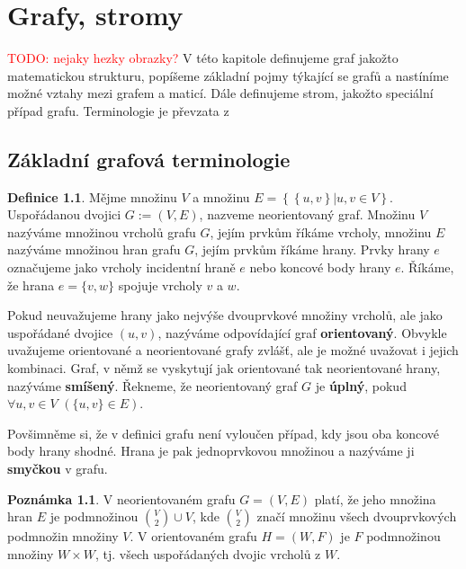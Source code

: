 \documentclass[11pt,american,czech,oneside]{book}
\theoremstyle{plain}
\theoremstyle{definition}
\newtheorem{definition}{Definice}
\newtheorem{remark}{Poznámka}
\newcommand{\TODO}[1]{\textcolor{red}{TODO: #1}}
\begin{document}

\chapter{Grafy, stromy} \TODO{nejaky hezky obrazky?} 
V této kapitole definujeme graf jakožto matematickou strukturu, popíšeme základní pojmy týkající se grafů a nastíníme možné vztahy mezi grafem a maticí. Dále definujeme strom, jakožto speciální případ grafu. Terminologie je převzata z \cite{koub:11}

\section{Základní grafová terminologie}

\begin{definition}
  Mějme množinu $V$ a množinu $E = \left\{ \left\{ u,v \right\} | u,v \in V \right\}$. Uspořádanou dvojici $G := (V,E)$, nazveme neorientovaný graf. Množinu $V$ nazýváme množinou vrcholů grafu $G$, jejím prvkům říkáme vrcholy, množinu $E$ nazýváme množinou hran grafu $G$, jejím prvkům říkáme hrany. Prvky hrany $e$ označujeme jako vrcholy incidentní hraně $e$ nebo koncové body hrany $e$. Říkáme, že hrana $e = \{v,w\}$ spojuje vrcholy $v$ a $w$.
\end{definition}

Pokud neuvažujeme hrany jako nejvýše dvouprvkové množiny vrcholů, ale  jako uspořádané dvojice $(u,v)$, nazýváme odpovídající graf \textbf{orientovaný}. Obvykle uvažujeme orientované a neorientované grafy zvlášť, ale je možné uvažovat i jejich kombinaci. Graf, v němž se vyskytují jak orientované tak neorientované hrany, nazýváme \textbf{smíšený}. Řekneme, že neorientovaný graf $G$ je \textbf{úplný}, pokud $\forall u, v \in V$ $\left(\{u,v\} \in E\right)$.

Povšimněme si, že v definici grafu není vyloučen případ, kdy jsou oba koncové body hrany shodné. Hrana je pak jednoprvkovou množinou a nazýváme ji \textbf{smyčkou} v grafu.

\begin{remark}
  V neorientovaném grafu $G=(V,E)$ platí, že jeho množina hran $E$ je podmnožinou ${V \choose 2} \cup V$, kde $V \choose 2$ značí množinu všech dvouprvkových podmnožin množiny $V$. V orientovaném grafu $H=(W,F)$ je $F$ podmnožinou množiny $W \times W$, tj. všech uspořádaných dvojic vrcholů z $W$.
\end{remark}
\end{document}
